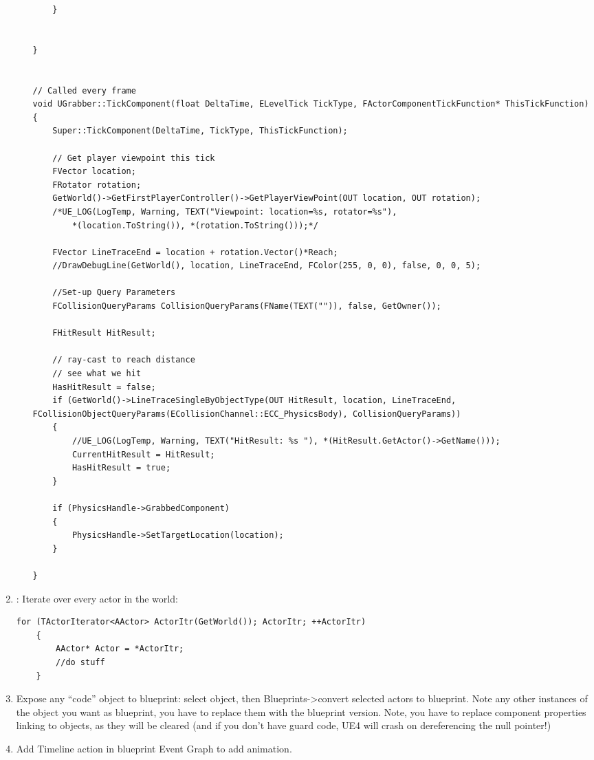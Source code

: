 \documentclass[letter,12pt]{article}
\begin{document}
\begin{enumerate}
\begin{enumerate}
\begin{verbatim}
	}


}


// Called every frame
void UGrabber::TickComponent(float DeltaTime, ELevelTick TickType, FActorComponentTickFunction* ThisTickFunction)
{
	Super::TickComponent(DeltaTime, TickType, ThisTickFunction);

	// Get player viewpoint this tick
	FVector location;
	FRotator rotation;
	GetWorld()->GetFirstPlayerController()->GetPlayerViewPoint(OUT location, OUT rotation);
	/*UE_LOG(LogTemp, Warning, TEXT("Viewpoint: location=%s, rotator=%s"),
		*(location.ToString()), *(rotation.ToString()));*/

	FVector LineTraceEnd = location + rotation.Vector()*Reach;
	//DrawDebugLine(GetWorld(), location, LineTraceEnd, FColor(255, 0, 0), false, 0, 0, 5);

	//Set-up Query Parameters
	FCollisionQueryParams CollisionQueryParams(FName(TEXT("")), false, GetOwner());

	FHitResult HitResult;

	// ray-cast to reach distance
	// see what we hit
	HasHitResult = false;
	if (GetWorld()->LineTraceSingleByObjectType(OUT HitResult, location, LineTraceEnd, FCollisionObjectQueryParams(ECollisionChannel::ECC_PhysicsBody), CollisionQueryParams))
	{
		//UE_LOG(LogTemp, Warning, TEXT("HitResult: %s "), *(HitResult.GetActor()->GetName()));
		CurrentHitResult = HitResult;
		HasHitResult = true;
	}
	
	if (PhysicsHandle->GrabbedComponent)
	{
		PhysicsHandle->SetTargetLocation(location);
	}

}
\end{verbatim}
\end{enumerate}

\item: Iterate over every actor in the world:

\begin{verbatim}
for (TActorIterator<AActor> ActorItr(GetWorld()); ActorItr; ++ActorItr)
	{
		AActor* Actor = *ActorItr;
		//do stuff
	}
\end{verbatim}

\item Expose any “code” object to blueprint: select object, then Blueprints->convert selected actors to blueprint.  Note any other instances of the object you want as blueprint, you have to replace them with the blueprint version.  Note, you have to replace component properties linking to objects, as they will be cleared (and if you don’t have guard code, UE4 will crash on dereferencing the null pointer!)

\item Add Timeline action in blueprint Event Graph to add animation.

\end{enumerate}
\end{document}
